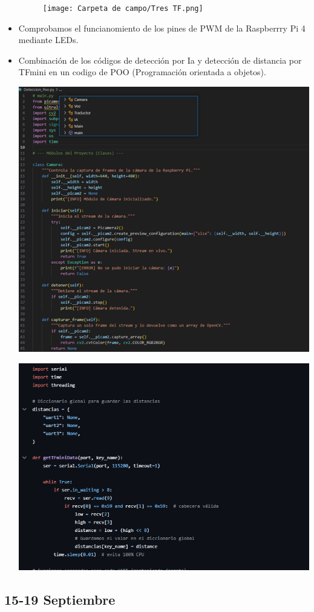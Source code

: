 \documentclass[12pt,a4paper]{article}
\begin{document}
\begin{itemize}
\begin{figure}[H]
    \centering
    \texttt{[image: Carpeta de campo/Tres TF.png]}
\end{figure}
\item Comprobamos el funcianomiento de los pines de PWM de la Raspberrry Pi 4 mediante LEDs.
\item Combinación de los códigos de detección por Ia y detección de distancia por TFmini en un codigo de POO (Programación orientada a objetos).


\includegraphics[width=0.7\linewidth]{Carpeta de campo/Imagen24.png}

\includegraphics[width=0.7\linewidth]{Carpeta de campo/imagen28.png}


\end{itemize}
\subsection*{15-19 Septiembre}
\end{document}
